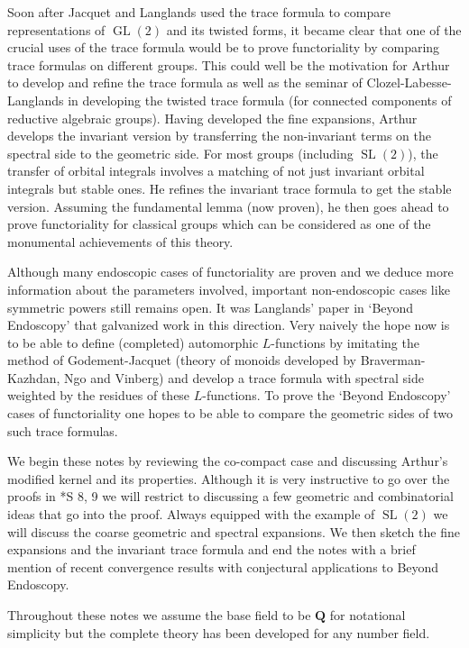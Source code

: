 \documentclass[11pt]{amsart}
\def\Q{\mathbf Q}
\def\gl{\operatorname{GL}}
\def\sl{\operatorname{SL}}
\theoremstyle{remark}
\begin{document}
	Soon after Jacquet and Langlands \cite{MR0401654} used the trace formula to compare representations of $\gl(2)$ and its twisted forms, it became clear that one of the crucial uses of the trace formula would be to prove functoriality by comparing trace formulas on different groups. This could well be the motivation for Arthur to develop and refine the trace formula as well as the seminar of Clozel-Labesse-Langlands in developing the twisted trace formula (for connected components of reductive algebraic groups). Having developed the fine expansions, Arthur develops the invariant version by transferring the non-invariant terms on the spectral side to the geometric side. For most groups (including $\sl(2)$), the transfer of orbital integrals involves a matching of not just invariant orbital integrals but stable ones. He refines the invariant trace formula to get the stable version. Assuming the fundamental lemma (now proven), he then goes ahead to prove functoriality for classical groups which can be considered as one of the monumental achievements of this theory. 

	Although many endoscopic cases of functoriality are proven and we deduce more information about the parameters involved, important non-endoscopic cases like symmetric powers still remains open. It was Langlands' paper in `Beyond Endoscopy' \cite{MR2058622} that galvanized work in this direction. Very naively the hope now is to be able to define (completed) automorphic $L$-functions by imitating the method of Godement-Jacquet (theory of monoids developed by Braverman-Kazhdan, Ngo and Vinberg) and develop a trace formula with spectral side weighted by the residues of these $L$-functions. To prove the `Beyond Endoscopy' cases of functoriality one hopes to be able to compare the geometric sides of two such trace formulas. 
	
	We begin these notes by reviewing the co-compact case and discussing Arthur's modified kernel and its properties. Although it is very instructive to go over the proofs in \cite{clay}*{S 8, 9} we will restrict to discussing a few geometric and combinatorial ideas that go into the proof. Always equipped with the example of $\sl(2)$ we will discuss the coarse geometric and spectral expansions. We then sketch the fine expansions and the invariant trace formula and end the notes with a brief mention of recent convergence results with conjectural applications to Beyond Endoscopy. 
	
	Throughout these notes we assume the base field to be $\Q$ for notational simplicity but the complete theory has been developed for any number field. 
\end{document}
